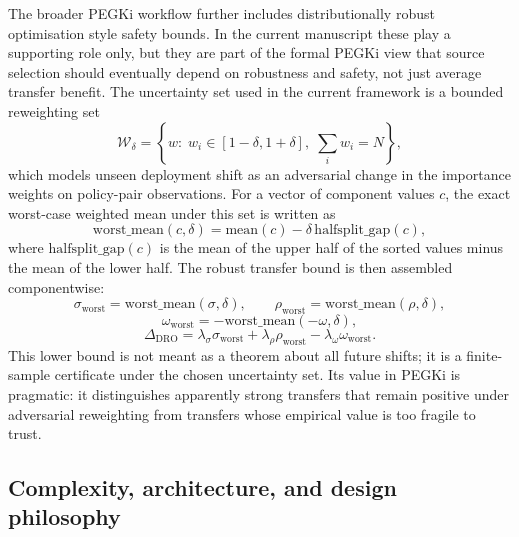 \documentclass[twoside,twocolumn,9pt]{article}
\begin{document}
The broader PEGKi workflow further includes distributionally robust optimisation style safety bounds. In the current manuscript these play a supporting role only, but they are part of the formal PEGKi view that source selection should eventually depend on robustness and safety, not just average transfer benefit. The uncertainty set used in the current framework is a bounded reweighting set
\[
\mathcal{W}_{\delta}=
\left\{
w:\; w_i\in[1-\delta,1+\delta],\;
\sum_i w_i=N
\right\},
\]
which models unseen deployment shift as an adversarial change in the importance weights on policy-pair observations. For a vector of component values $c$, the exact worst-case weighted mean under this set is written as
\[
\mathrm{worst\_mean}(c,\delta)=
\mathrm{mean}(c)-\delta\,\mathrm{halfsplit\_gap}(c),
\]
where $\mathrm{halfsplit\_gap}(c)$ is the mean of the upper half of the sorted values minus the mean of the lower half. The robust transfer bound is then assembled componentwise:
\[
\sigma_{\mathrm{worst}}=\mathrm{worst\_mean}(\sigma,\delta),\qquad
\rho_{\mathrm{worst}}=\mathrm{worst\_mean}(\rho,\delta),
\]
\[
\omega_{\mathrm{worst}}=
-\mathrm{worst\_mean}(-\omega,\delta),
\]
\[
\Delta_{\mathrm{DRO}}=
\lambda_{\sigma}\sigma_{\mathrm{worst}}
+\lambda_{\rho}\rho_{\mathrm{worst}}
-\lambda_{\omega}\omega_{\mathrm{worst}}.
\]
This lower bound is not meant as a theorem about all future shifts; it is a finite-sample certificate under the chosen uncertainty set. Its value in PEGKi is pragmatic: it distinguishes apparently strong transfers that remain positive under adversarial reweighting from transfers whose empirical value is too fragile to trust.

\subsection{Complexity, architecture, and design philosophy}
\end{document}

